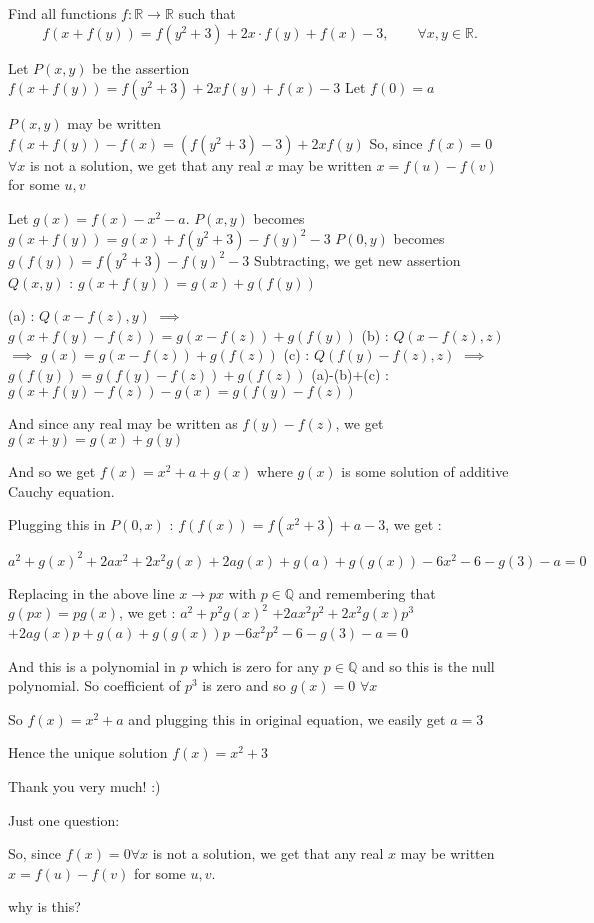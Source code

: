 \begin{solution}
	\begin{tcolorbox}Find all functions $f: \mathbb R \to \mathbb R$ such that
\[f(x+f(y))=f(y^2+3)+2x\cdot f(y)+f(x)-3, \qquad \forall x,y \in \mathbb R.\]\end{tcolorbox}
Let $P(x,y)$ be the assertion $f(x+f(y))=f(y^2+3)+2xf(y)+f(x)-3$
Let $f(0)=a$

$P(x,y)$ may be written $f(x+f(y))-f(x)=(f(y^2+3)-3)+2xf(y)$
So, since $f(x)=0$ $\forall x$ is not a solution, we get that any real $x$ may be written $x=f(u)-f(v)$ for some $u,v$

Let $g(x)=f(x)-x^2-a$.
$P(x,y)$ becomes $g(x+f(y))=g(x)+f(y^2+3)-f(y)^2-3$
$P(0,y)$ becomes $g(f(y))=f(y^2+3)-f(y)^2-3$
Subtracting, we get new assertion $Q(x,y)$ : $g(x+f(y))=g(x)+g(f(y))$

(a) : $Q(x-f(z),y)$ $\implies$ $g(x+f(y)-f(z))=g(x-f(z))+g(f(y))$
(b) : $Q(x-f(z),z)$ $\implies$ $g(x)=g(x-f(z))+g(f(z))$
(c) : $Q(f(y)-f(z),z)$ $\implies$ $g(f(y))=g(f(y)-f(z))+g(f(z))$
(a)-(b)+(c) : $g(x+f(y)-f(z))-g(x)=g(f(y)-f(z))$

And since any real may be written as $f(y)-f(z)$, we get $g(x+y)=g(x)+g(y)$

And so we get $f(x)=x^2+a+g(x)$ where $g(x)$ is some solution of additive Cauchy equation.

Plugging this in $P(0,x)$ : $f(f(x))=f(x^2+3)+a-3$, we get :

$a^2+g(x)^2+2ax^2+2x^2g(x)+2ag(x)+g(a)+g(g(x))-6x^2-6-g(3)-a=0$

Replacing in the above line $x\to px$ with $p\in\mathbb Q$ and remembering that $g(px)=pg(x)$, we get :
$a^2+p^2g(x)^2$ $+2ax^2p^2+2x^2g(x)p^3$ $+2ag(x)p+g(a)+g(g(x))p$ $-6x^2p^2-6-g(3)-a=0$

And this is a polynomial in $p$ which is zero for any $p\in\mathbb Q$ and so this is the null polynomial.
So coefficient of $p^3$ is zero and so $g(x)=0$ $\forall x$

So $f(x)=x^2+a$ and plugging this in original equation, we easily get $a=3$

Hence the unique solution $\boxed{f(x)=x^2+3}$
\end{solution}



\begin{solution}
	Thank you very much! :)

Just one question: \begin{tcolorbox}So, since $f(x)=0 \forall x$ is not a solution, we get that any real $x$ may be written $x=f(u)-f(v)$ for some $u,v$.\end{tcolorbox}
why is this?
\end{solution}



